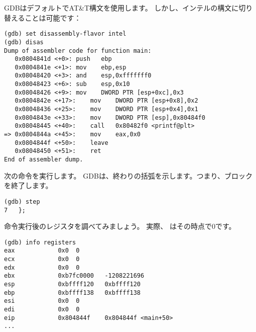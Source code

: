 \ac{GDB}はデフォルトでAT\&T構文を使用します。
しかし、インテルの構文に切り替えることは可能です：

\begin{lstlisting}[style=customasmx86]
(gdb) set disassembly-flavor intel
(gdb) disas
Dump of assembler code for function main:
   0x0804841d <+0>:	push   ebp
   0x0804841e <+1>:	mov    ebp,esp
   0x08048420 <+3>:	and    esp,0xfffffff0
   0x08048423 <+6>:	sub    esp,0x10
   0x08048426 <+9>:	mov    DWORD PTR [esp+0xc],0x3
   0x0804842e <+17>:	mov    DWORD PTR [esp+0x8],0x2
   0x08048436 <+25>:	mov    DWORD PTR [esp+0x4],0x1
   0x0804843e <+33>:	mov    DWORD PTR [esp],0x80484f0
   0x08048445 <+40>:	call   0x80482f0 <printf@plt>
=> 0x0804844a <+45>:	mov    eax,0x0
   0x0804844f <+50>:	leave  
   0x08048450 <+51>:	ret    
End of assembler dump.
\end{lstlisting}

次の命令を実行します。 
\ac{GDB}は、終わりの括弧を示します。つまり、ブロックを終了します。

\begin{lstlisting}
(gdb) step
7	};
\end{lstlisting}

命令実行後のレジスタを調べてみましょう。 
実際、 \EAX はその時点で0です。

\begin{lstlisting}
(gdb) info registers
eax            0x0	0
ecx            0x0	0
edx            0x0	0
ebx            0xb7fc0000	-1208221696
esp            0xbffff120	0xbffff120
ebp            0xbffff138	0xbffff138
esi            0x0	0
edi            0x0	0
eip            0x804844f	0x804844f <main+50>
...
\end{lstlisting}

